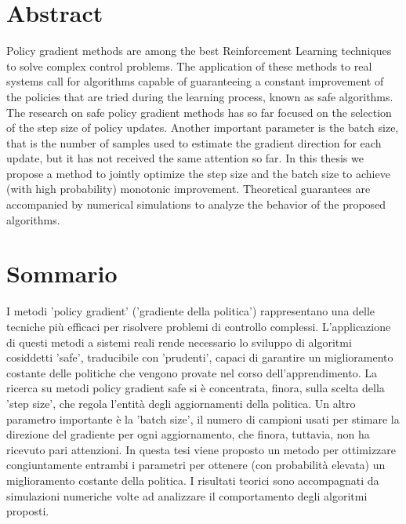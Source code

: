 
\begingroup
\let\clearpage\relax
\let\cleardoublepage\relax
\let\cleardoublepage\relax

\chapter*{Abstract}
Policy gradient methods are among the best Reinforcement Learning techniques to solve complex control problems. The application of these methods to real systems call for algorithms capable of guaranteeing a constant improvement of the policies that are tried during the learning process, known as safe algorithms. The research on safe policy gradient methods has so far focused on the selection of the step size of policy updates. Another important parameter is the batch size, that is the number of samples used to estimate the gradient direction for each update, but it has not received the same attention so far. In this thesis we propose a method to jointly optimize the step size and the batch size to achieve (with high probability) monotonic improvement. Theoretical guarantees are accompanied by numerical simulations to analyze the behavior of the proposed algorithms.  

\vfill
\newpage
{}
\chapter*{Sommario}
I metodi 'policy gradient' ('gradiente della politica') rappresentano una delle tecniche più efficaci per risolvere problemi di controllo complessi. L'applicazione di questi metodi a sistemi reali rende necessario lo sviluppo di algoritmi cosiddetti 'safe', traducibile con 'prudenti', capaci di garantire un miglioramento costante delle politiche che vengono provate nel corso dell'apprendimento. La ricerca su metodi policy gradient safe si è concentrata, finora, sulla scelta della 'step size', che regola l'entità degli aggiornamenti della politica. Un altro parametro importante è la 'batch size', il numero di campioni usati per stimare la direzione del gradiente per ogni aggiornamento, che finora, tuttavia, non ha ricevuto pari attenzioni. In questa tesi viene proposto un metodo per ottimizzare congiuntamente entrambi i parametri per ottenere (con probabilità elevata) un miglioramento costante della politica. I risultati teorici sono accompagnati da simulazioni numeriche volte ad analizzare il comportamento degli algoritmi proposti.

\endgroup